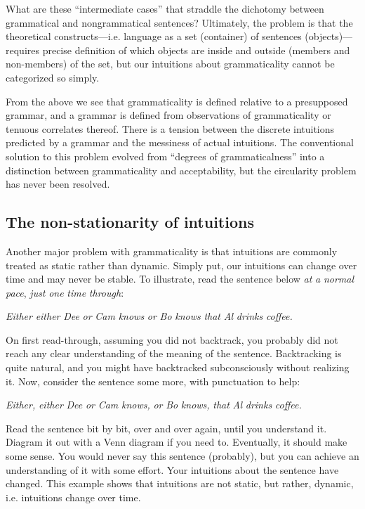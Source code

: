   What are these “intermediate cases” that straddle the dichotomy between grammatical and nongrammatical sentences? Ultimately, the problem is that the theoretical constructs—i.e. language as a set (container) of sentences (objects)—requires precise definition of which objects are inside and outside (members and non-members) of the set, but our intuitions about grammaticality cannot be categorized so simply.

  From the above we see that grammaticality is defined relative to a presupposed grammar, and a grammar is defined from observations of grammaticality or tenuous correlates thereof. There is a tension between the discrete intuitions predicted by a grammar and the messiness of actual intuitions. The conventional solution to this problem evolved from “degrees of grammaticalness” into a distinction between grammaticality and acceptability, but the circularity problem has never been resolved. 

\subsection{The non-stationarity of intuitions}

Another major problem with grammaticality is that intuitions are commonly treated as static rather than dynamic. Simply put, our intuitions can change over time and may never be stable. To illustrate, read the sentence below \textit{at} \textit{a} \textit{normal} \textit{pace}, \textit{just} \textit{one} \textit{time} \textit{through}:

    \textit{Either} \textit{either} \textit{Dee} \textit{or} \textit{Cam} \textit{knows} \textit{or} \textit{Bo} \textit{knows} \textit{that} \textit{Al} \textit{drinks} \textit{coffee.}

On first read-through, assuming you did not backtrack, you probably did not reach any clear understanding of the meaning of the sentence. Backtracking is quite natural, and you might have backtracked subconsciously without realizing it. Now, consider the sentence some more, with punctuation to help:

    \textit{Either,} \textit{either} \textit{Dee} \textit{or} \textit{Cam} \textit{knows,} \textit{or} \textit{Bo} \textit{knows,} \textit{that} \textit{Al} \textit{drinks} \textit{coffee.}

  Read the sentence bit by bit, over and over again, until you understand it. Diagram it out with a Venn diagram if you need to. Eventually, it should make some sense. You would never say this sentence (probably), but you can achieve an understanding of it with some effort. Your intuitions about the sentence have changed. This example shows that intuitions are not static, but rather, dynamic, i.e. intuitions change over time.

